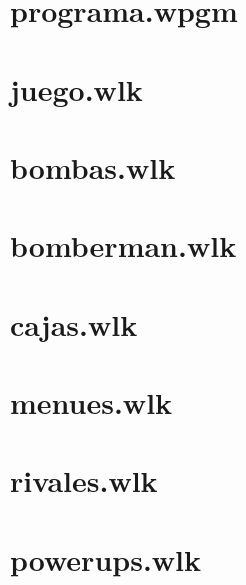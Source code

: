 \documentclass[11pt,a4paper]{article}
\begin{document}
\pagestyle{fancy}
\lhead{\sc }
\chead{}
\rhead{\rightmark}
\lfoot{}
\cfoot{}
\rfoot{\thepage}

%

%


\newpage

\section{programa.wpgm}


\section{juego.wlk}


\section{bombas.wlk}


\section{bomberman.wlk}


\section{cajas.wlk}


\section{menues.wlk}


\section{rivales.wlk}


\section{powerups.wlk}

\newpage

\appendix


%
%
\end{document}
